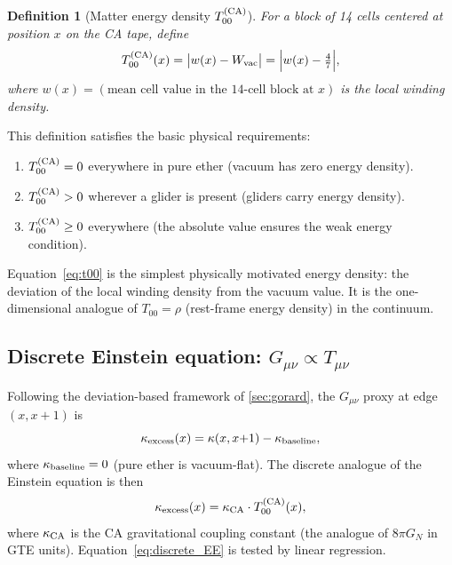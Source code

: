 \documentclass[11pt]{article}
\newtheorem{definition}[theorem]{Definition}
\theoremstyle{remark}
\newcommand{\kCA}{\kappa_{\rm CA}}
\begin{document}
\begin{definition}[Matter energy density $T_{00}^{(\rm CA)}$]
\label{def:t00}
For a block of 14 cells centered at position $x$ on the CA tape, define
\begin{equation}
  T_{00}^{(\rm CA)}(x) = \bigl|w(x) - W_{\rm vac}\bigr|
  = \Bigl|w(x) - \tfrac{4}{7}\Bigr|,
  \label{eq:t00}
\end{equation}
where $w(x) = (\text{mean cell value in the 14-cell block at } x)$ is the
local winding density.
\end{definition}

This definition satisfies the basic physical requirements:
\begin{enumerate}[leftmargin=2em]
\item $T_{00}^{(\rm CA)} = 0$ everywhere in pure ether (vacuum has zero energy density).
\item $T_{00}^{(\rm CA)} > 0$ wherever a glider is present (gliders carry energy density).
\item $T_{00}^{(\rm CA)} \geq 0$ everywhere (the absolute value ensures the weak
energy condition).
\end{enumerate}

Equation~\eqref{eq:t00} is the simplest physically motivated energy density:
the deviation of the local winding density from the vacuum value.
It is the one-dimensional analogue of $T_{00} = \rho$ (rest-frame energy density)
in the continuum.

\subsection{Discrete Einstein equation: \texorpdfstring{$G_{\mu\nu} \propto T_{\mu\nu}$}{G proportional to T}}
\label{ssec:einstein_eq}

Following the deviation-based framework of \cref{sec:gorard}, the
$G_{\mu\nu}$ proxy at edge $(x, x+1)$ is
\begin{equation}
  \kappa_{\rm excess}(x) = \kappa(x, x{+}1) - \kappa_{\rm baseline},
  \label{eq:kappa_excess}
\end{equation}
where $\kappa_{\rm baseline} = 0$ (pure ether is vacuum-flat).
The discrete analogue of the Einstein equation is then
\begin{equation}
  \kappa_{\rm excess}(x) = \kCA \cdot T_{00}^{(\rm CA)}(x),
  \label{eq:discrete_EE}
\end{equation}
where $\kCA$ is the CA gravitational coupling constant (the analogue of
$8\pi G_N$ in GTE units).
Equation~\eqref{eq:discrete_EE} is tested by linear regression.
\end{document}
